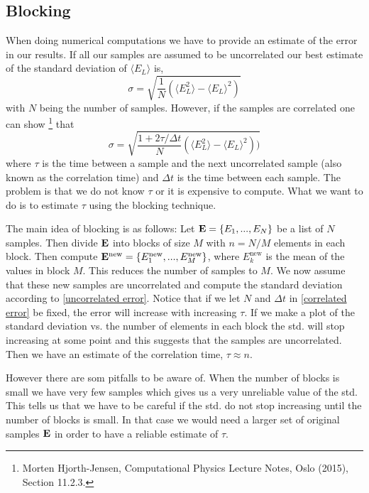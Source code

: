 \documentclass[a4paper,10pt]{article}
\begin{document}
\subsection{Blocking} \label{Blocking section}
When doing numerical computations we have to provide an estimate of the error in our results. If all our samples are assumed to
be uncorrelated our best estimate of the standard deviation of $\langle E_L \rangle$ is,
\begin{equation}
 \sigma = \sqrt{\frac{1}{N}(\langle E_L^2 \rangle - \langle E_L \rangle^2)} \label{uncorrelated error}
\end{equation}
with $N$ being the number of samples. However, if the samples are correlated one can show \footnote{Morten Hjorth-Jensen, Computational Physics Lecture Notes, Oslo (2015), Section 11.2.3.} that
\begin{equation}
 \sigma = \sqrt{\frac{1+2\tau/\Delta t}{N} (\langle E_L^2 \rangle - \langle E_L \rangle^2))} \label{correlated error}
\end{equation}
where $\tau$ is the time between a sample and the next uncorrelated sample (also known as the correlation time) and $\Delta t$ is the time between each sample. The problem is
that we do not know $\tau$ or it is expensive to compute. What we want to do is to estimate $\tau$ using the blocking technique. 

The main idea of blocking is as follows: Let ${\bf E} = \{E_1, ... , E_{N} \}$ be a list of $N$ samples. Then divide ${\bf E}$ into
blocks of size $M$ with $n=N/M$ elements in each block. Then compute ${\bf E}^{\text{new}} = \{E_1^{\text{new}},...,E_{M}^{\text{new}}\}$, where $E_k^{\text{new}}$ is the mean of the values in block $M$. This reduces the number
of samples to $M$. We now assume that these new samples are uncorrelated and compute the standard deviation according to \ref{uncorrelated error}. Notice that if we let $N$ and $\Delta t$ in
\ref{correlated error} be fixed, the error will increase with increasing $\tau$. If we make a plot of the standard deviation vs. the number of elements in each block the std. will stop increasing 
at some point and this suggests that the samples are uncorrelated. Then we have an estimate of the correlation time, $\tau \approx n$. 

However there are som pitfalls to be aware of. When the number of 
blocks is small we have very few samples which gives us a very unreliable value of the std. This tells us that we have to be careful if the std. do not stop increasing
until the number of blocks is small. In that case we would need a larger set of original samples ${\bf E}$ in order to have a reliable estimate of $\tau$.
\end{document}
